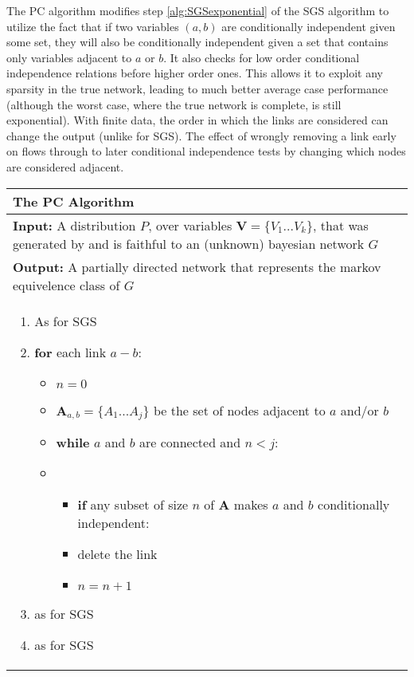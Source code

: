\documentclass[11pt,a4paper]{article}
\begin{document}
The PC algorithm \cite{Sprites} modifies step \ref{alg:SGSexponential} of the SGS algorithm to utilize the fact that if two variables $(a,b)$ are conditionally independent given some set, they will also be conditionally independent given a set that contains only variables adjacent to $a$ or $b$. It also checks for low order conditional independence relations before higher order ones. This allows it to exploit any sparsity in the true network, leading to much better average case performance  \cite{Sprites} (although the worst case, where the true network is complete, is still exponential). With finite data, the order in which the links are considered can change the output (unlike for SGS). The effect of wrongly removing a link early on flows through to later conditional independence tests by changing which nodes are considered adjacent.


\begin{table}[H]
 \begin{tabularx}{\textwidth}{X}
 \hline
\rule{0pt}{2.5ex} 
 \textbf{The PC Algorithm}\\
 \hline
 \rule{0pt}{2.5ex}
\textbf{Input:} A distribution $P$, over variables $\boldsymbol{V} = \{V_{1}...V_{k}\}$, that was generated by and is faithful to an (unknown) bayesian network $G$\\
\textbf{Output:} A partially directed network that represents the markov equivelence class of $G$\\
 \begin{enumerate}[itemsep=8pt]
  \item As for SGS
  \item \textbf{for} each link $a-b$:
  \begin{itemize}[label={}]
   \item $n = 0$
   \item $\boldsymbol{A}_{a,b} = \{A_{1}...A_{j}\}$ be the set of nodes adjacent to $a$ and/or $b$
   \item \textbf{while} $a$ and $b$ are connected and $n < j$:
   \item 
    	\begin{itemize}[label={}]
    	\item \textbf{if} any subset of size $n$ of $\boldsymbol{A}$ makes $a$ and $b$ conditionally independent:
    	\item \begin{itemize}[label={}]
    			delete the link
    		  \end{itemize}
    	
    	\item $n = n+1$
    	\end{itemize}
  \end{itemize}   
  \item as for SGS
  \item as for SGS
\end{enumerate}\\
 \hline
\end{tabularx}
\end{table}
\end{document}
